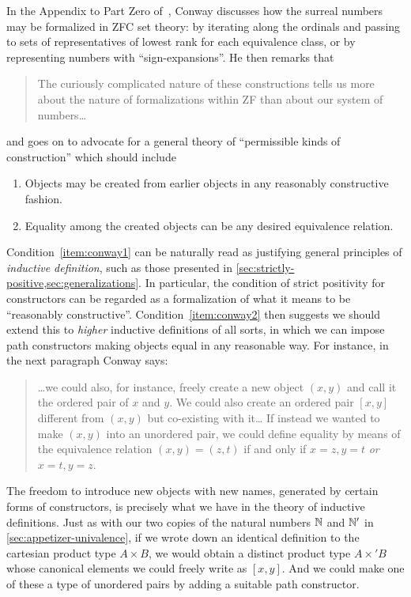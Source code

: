 %
%
In the Appendix to Part Zero of~\cite{conway:onag}, Conway discusses how the surreal numbers may be formalized in ZFC set theory: by iterating along the ordinals and passing to sets of representatives of lowest rank for each equivalence class, or by representing numbers with ``sign-expansions''.
He then remarks that
\begin{quote}\footnotesize
  The curiously complicated nature of these constructions tells us more about the nature of formalizations within ZF than about our system of numbers\dots
\end{quote}
and goes on to advocate for a general theory of ``permissible kinds of construction'' which should include
\begin{enumerate}\footnotesize
\item Objects may be created from earlier objects in any reasonably constructive fashion.\label{item:conway1}
\item Equality among the created objects can be any desired equivalence relation.\label{item:conway2}
\end{enumerate}
\noindent
Condition~\ref{item:conway1} can be naturally read as justifying general principles of \emph{inductive definition}, such as those presented in \cref{sec:strictly-positive,sec:generalizations}.
In particular, the condition of strict positivity for constructors can be regarded as a formalization of what it means to be ``reasonably constructive''.
Condition~\ref{item:conway2} then suggests we should extend this to \emph{higher} inductive definitions of all sorts, in which we can impose path constructors making objects equal in any reasonable way.
For instance, in the next paragraph Conway says:
\begin{quote}\footnotesize
  \dots we could also, for instance, freely create a new object $(x,y)$ and call it the ordered pair of $x$ and $y$.
  We could also create an ordered pair $[x,y]$ different from $(x,y)$ but co-existing with it\dots
  If instead we wanted to make $(x,y)$ into an unordered pair, we could define equality by means of the equivalence relation $(x,y)=(z,t)$ if and only if $x=z,y=t$ \emph{or} $x=t,y=z$.
\end{quote}
The freedom to introduce new objects with new names, generated by certain forms of constructors, is precisely what we have in the theory of inductive definitions.
Just as with our two copies of the natural numbers $\mathbb{N}$ and $\mathbb{N}'$ in \cref{sec:appetizer-univalence}, if we wrote down an identical definition to the cartesian product type $A\times B$, we would obtain a distinct product type $A\times' B$ whose canonical elements we could freely write as $[x,y]$.
And we could make one of these a type of unordered pairs by adding a suitable path constructor. %

